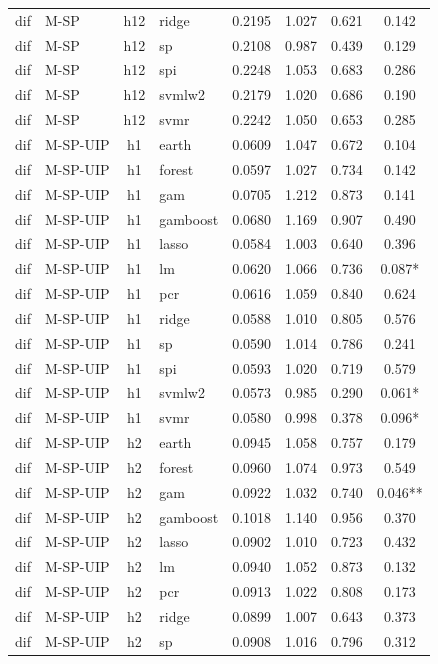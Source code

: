 \begin{ThreePartTable}
\begin{longtable}[t]{llclcccc}
dif & M-SP & h12 & ridge & 0.2195 & 1.027 & 0.621 & 0.142\\
dif & M-SP & h12 & sp & 0.2108 & 0.987 & 0.439 & 0.129\\
dif & M-SP & h12 & spi & 0.2248 & 1.053 & 0.683 & 0.286\\
dif & M-SP & h12 & svmlw2 & 0.2179 & 1.020 & 0.686 & 0.190\\
dif & M-SP & h12 & svmr & 0.2242 & 1.050 & 0.653 & 0.285\\
\addlinespace
dif & M-SP-UIP & h1 & earth & 0.0609 & 1.047 & 0.672 & 0.104\\
dif & M-SP-UIP & h1 & forest & 0.0597 & 1.027 & 0.734 & 0.142\\
dif & M-SP-UIP & h1 & gam & 0.0705 & 1.212 & 0.873 & 0.141\\
dif & M-SP-UIP & h1 & gamboost & 0.0680 & 1.169 & 0.907 & 0.490\\
dif & M-SP-UIP & h1 & lasso & 0.0584 & 1.003 & 0.640 & 0.396\\
dif & M-SP-UIP & h1 & lm & 0.0620 & 1.066 & 0.736 & 0.087*\\
dif & M-SP-UIP & h1 & pcr & 0.0616 & 1.059 & 0.840 & 0.624\\
dif & M-SP-UIP & h1 & ridge & 0.0588 & 1.010 & 0.805 & 0.576\\
dif & M-SP-UIP & h1 & sp & 0.0590 & 1.014 & 0.786 & 0.241\\
dif & M-SP-UIP & h1 & spi & 0.0593 & 1.020 & 0.719 & 0.579\\
dif & M-SP-UIP & h1 & svmlw2 & 0.0573 & 0.985 & 0.290 & 0.061*\\
dif & M-SP-UIP & h1 & svmr & 0.0580 & 0.998 & 0.378 & 0.096*\\
\addlinespace
dif & M-SP-UIP & h2 & earth & 0.0945 & 1.058 & 0.757 & 0.179\\
dif & M-SP-UIP & h2 & forest & 0.0960 & 1.074 & 0.973 & 0.549\\
dif & M-SP-UIP & h2 & gam & 0.0922 & 1.032 & 0.740 & 0.046**\\
dif & M-SP-UIP & h2 & gamboost & 0.1018 & 1.140 & 0.956 & 0.370\\
dif & M-SP-UIP & h2 & lasso & 0.0902 & 1.010 & 0.723 & 0.432\\
dif & M-SP-UIP & h2 & lm & 0.0940 & 1.052 & 0.873 & 0.132\\
dif & M-SP-UIP & h2 & pcr & 0.0913 & 1.022 & 0.808 & 0.173\\
dif & M-SP-UIP & h2 & ridge & 0.0899 & 1.007 & 0.643 & 0.373\\
dif & M-SP-UIP & h2 & sp & 0.0908 & 1.016 & 0.796 & 0.312\\

\end{longtable}
\end{ThreePartTable}
